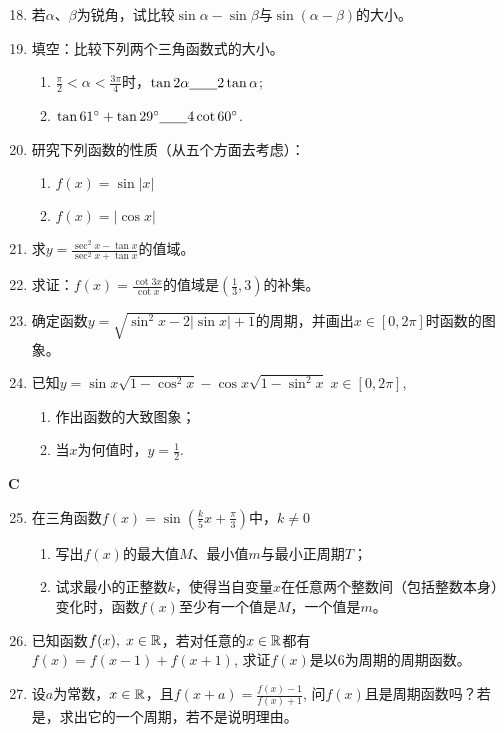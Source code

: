 \begin{enumerate}\setcounter{enumi}{17}
    \item 若$\alpha$、$\beta$为锐角，试比较$\sin\alpha-\sin\beta$与$\sin(\alpha-\beta)$的大小。
    \item 填空：比较下列两个三角函数式的大小。
\begin{enumerate}[(1)]
    \item $\frac{\pi}{2}<\alpha<\frac{3\pi}{4}$时，$\tan2\alpha\underline{\qquad} 2\tan\alpha$;
    \item $\tan61^{\circ}+\tan29^{\circ}\underline{\qquad} 4\cot60^{\circ}$.
\end{enumerate}
    \item 研究下列函数的性质（从五个方面去考虑）：
\begin{multicols}{2}
\begin{enumerate}[(1)]
    \item $f(x)=\sin|x|$
    \item $f(x)=|\cos x|$
\end{enumerate}
\end{multicols}
    \item 求$y=\frac{\sec^2 x-\tan x}{\sec^2 x+\tan x}$的值域。
    \item 求证：$f(x)=\frac{\cot 3x}{\cot x}$的值域是$\left(\frac{1}{3},3\right)$的补集。
    \item 确定函数$y=\sqrt{\sin^2 x-2|\sin x|+1}$的周期，并画出$x\in[0,2\pi]$时函数的图象。
    \item 已知$y=\sin x\sqrt{1-\cos^2x}-\cos x \sqrt{1-\sin^2x}\; x\in[0,2\pi]$,
\begin{enumerate}[(1)]
    \item 作出函数的大致图象；
    \item 当$x$为何值时，$y=\frac{1}{2}$.
\end{enumerate}
\end{enumerate}

\begin{center}
    \bfseries C
\end{center}

\begin{enumerate}\setcounter{enumi}{24}
    \item 在三角函数$f(x)=\sin\left(\frac{k}{5}x+\frac{\pi}{3}\right)$中，$k\ne 0$
\begin{enumerate}[(1)]
\item 写出$f(x)$的最大值$M$、最小值$m$与最小正周期$T$；
\item 试求最小的正整数$k$，使得当自变量$x$在任意两个整数间（包括整数本身）变化时，函数$f(x)$至少有一个值是$M$，一个值是$m$。
\end{enumerate}
    \item 已知函数$f(x),\; x\in\mathbb{R}$，若对任意的$x\in\mathbb{R}$都有
   $ f(x)=f(x-1)+f(x+1)$, 
    求证$f(x)$是以6为周期的周期函数。
    \item 设$a$为常数，$x\in\mathbb{R}$，且$f(x+a)=\frac{f(x)-1}{f(x)+1}$, 问$f(x)$且是周期函数吗？若是，求出它的一个周期，若不是说明理由。
\end{enumerate}


